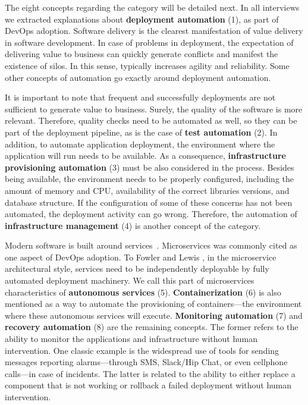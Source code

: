 
The eight concepts regarding the  category will be detailed next.
In all interviews we extracted explanations about \textbf{deployment
automation} (1), as part of DevOps adoption. Software delivery is the clearest
manifestation of value delivery in software development. In case of problems
in deployment, the expectation of delivering value to business can quickly
generate conflicts and manifest the existence of silos.
In this sense,  typically increases agility and reliability. Some other
concepts of automation go exactly around deployment automation.

It is important to note that frequent and successfully
deployments are not sufficient to generate value to business. Surely, the quality of
the software is more relevant. Therefore, quality checks need to be automated as well, so they can be part of the
deployment pipeline, as is the case of \textbf{test automation} (2). In addition, to
automate application deployment, the environment where the
application will run needs to be available. As a consequence, \textbf{infrastructure
provisioning automation} (3) must be also considered in the process. Besides being available,
the environment needs to be properly configured, including the amount of memory and CPU,
availability of the correct libraries versions, and database structure. If the configuration of some of these concerns
has not been automated, the deployment activity can go wrong. Therefore,
the automation of \textbf{infrastructure management} (4) is another
concept of the  category.

Modern software is built around services~\cite{Luz:2018:SBES}. Microservices  was commonly cited
as one aspect of DevOps adoption. To Fowler and Lewis
\cite{martinfowler2014microservices}, in the
microservice architectural style, services need to be independently deployable
by fully automated deployment machinery. We call this part of microservices
characteristics of \textbf{autonomous services} (5). \textbf{Containerization}
(6) is also mentioned as a way to automate the provisioning of containers---the
environment where these autonomous services will execute.
\textbf{Monitoring automation} (7) and \textbf{recovery automation} (8) are the
remaining concepts. The former refers to the ability to monitor the
applications and infrastructure without human intervention. One classic example
is the widespread use of tools for sending messages reporting
alarms---through SMS, Slack/Hip Chat, or even
cellphone calls---in case of incidents. The latter is related to the ability
to either replace a component that is not working or
rollback a failed deployment without human intervention.


